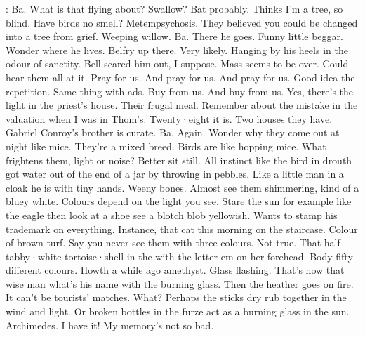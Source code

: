 \Bloom:
Ba.
What is that flying about?
Swallow?
Bat probably.
Thinks I'm a tree,
so blind.
Have birds no smell?
Metempsychosis.
They believed you could be
changed into a tree from grief.
Weeping willow.
Ba.
There he goes.
Funny little beggar.
Wonder where he lives.
Belfry up there.
Very likely.
Hanging by his heels in the odour of sanctity.
Bell scared him out,
I suppose.
Mass seems to be over.
Could hear them all at it.
Pray for us.
And pray for us.
And pray for us.
Good idea the repetition.
Same
thing with ads.
Buy from us.
And buy from us.
Yes,
there's the light
in the priest's house.
Their frugal meal.
Remember about the mistake
in the valuation when I was in Thom's.
Twenty·eight it is.
Two houses
they have.
Gabriel Conroy's brother is curate.
Ba.
Again.
Wonder why
they come out at night like mice.
They're a mixed breed.
Birds are
like hopping mice.
What frightens them,
light or noise?
Better sit still.
All instinct like the bird in drouth got water out of the end of a
jar by throwing in pebbles.
Like a little man in a cloak he is with tiny hands.
Weeny bones.
Almost see them shimmering,
kind of a bluey white.
Colours depend on the light you see.
Stare the sun for example
like the eagle then look at a shoe see a blotch blob yellowish.
Wants to
stamp his trademark on everything.
Instance,
that cat this morning on the
staircase.
Colour of brown turf.
Say you never see them with three
colours.
Not true.
That half tabby·white tortoise·shell in the 
with the letter em on her forehead.
Body fifty different colours.
Howth
a while ago amethyst.
Glass flashing.
That's how that wise man what's his
name with the burning glass.
Then the heather goes on fire.
It can't be
tourists' matches.
What?
Perhaps the sticks dry rub together in the wind
and light.
Or broken bottles in the furze act as a burning glass in the
sun.
Archimedes.
I have it!
My memory's not so bad.

